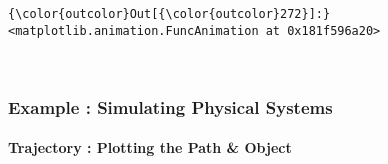 \documentclass[11pt]{article}
\begin{document}
\begin{Verbatim}[commandchars=\\\{\}]
{\color{outcolor}Out[{\color{outcolor}272}]:} <matplotlib.animation.FuncAnimation at 0x181f596a20>
\end{Verbatim}
            
    \begin{center}
    \end{center}
    { \hspace*{\fill} \\}
    
    \subsubsection{Example : Simulating Physical
Systems}\label{example-simulating-physical-systems}

\paragraph{Trajectory : Plotting the Path \&
Object}\label{trajectory-plotting-the-path-object}
\end{document}
